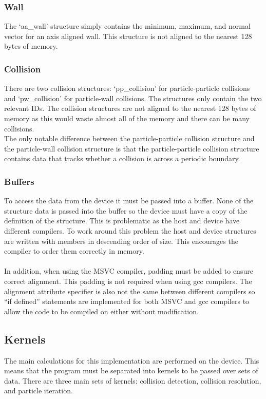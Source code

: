 \documentclass[a4paper,11pt,titlepage]{report}
\begin{document}
\subsubsection{Wall}
The `aa\_wall' structure simply contains the minimum, maximum, and normal vector for an axis aligned wall. This structure is not aligned to the nearest 128 bytes of memory.
\subsubsection{Collision}
There are two collision structures: `pp\_collision' for particle-particle collisions and `pw\_collision' for particle-wall collisions. The structures only contain the two relevant IDs. The collision structures are not aligned to the nearest 128 bytes of memory as this would waste almost all of the memory and there can be many collisions.
\\The only notable difference between the particle-particle collision structure and the particle-wall collision structure is that the particle-particle collision structure contains data that tracks whether a collision is across a periodic boundary.
\subsubsection{Buffers}
To access the data from the device it must be passed into a buffer. None of the structure data is passed into the buffer so the device must have a copy of the definition of the structure. This is problematic as the host and device have different compilers. To work around this problem the host and device structures are written with members in descending order of size. This encourages the compiler to order them correctly in memory.
\\\\In addition, when using the MSVC compiler, padding must be added to ensure correct alignment. This padding is not required when using gcc compilers. The alignment attribute specifier is also not the same between different compilers so ``if defined'' statements are implemented for both MSVC and gcc compilers to allow the code to be compiled on either without modification.
\subsection{Kernels}
The main calculations for this implementation are performed on the device. This means that the program must be separated into kernels to be passed over sets of data. There are three main sets of kernels: collision detection, collision resolution, and particle iteration.
\end{document}
